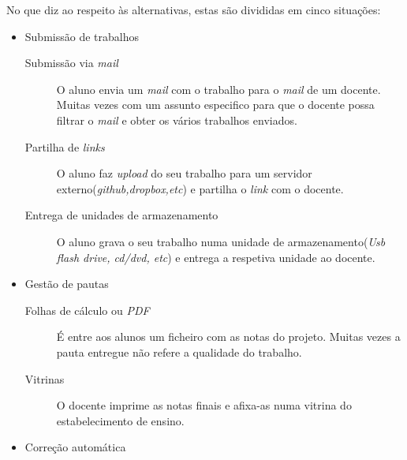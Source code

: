 No que diz ao respeito às alternativas, estas são divididas em cinco situações:
\begin{itemize}
	\item Submissão de trabalhos

	\begin{description}
		\item[Submissão via \emph{mail}] O aluno envia um \emph{mail} com o trabalho para o \emph{mail} de um docente. Muitas vezes com um assunto especifico para que o docente possa filtrar o \emph{mail} e obter os vários trabalhos enviados.
		\item[Partilha de \emph{links}] O aluno faz \emph{upload} do seu trabalho para um servidor externo(\emph{github,dropbox,etc}) e partilha o \emph{link} com o docente.
		\item[Entrega de unidades de armazenamento] O aluno grava o seu trabalho numa unidade de armazenamento(\emph{Usb flash drive, cd/dvd, etc}) e entrega a respetiva unidade ao docente.
	\end{description}

	\item Gestão de pautas

	\begin{description}
		\item[Folhas de cálculo ou \emph{PDF}] É entre aos alunos um ficheiro com as notas do projeto. Muitas vezes a pauta entregue não refere a qualidade do trabalho.
		\item[Vitrinas] O docente imprime as notas finais e afixa-as numa vitrina do estabelecimento de ensino.
	\end{description}

	\item Correção automática


\end{itemize}
